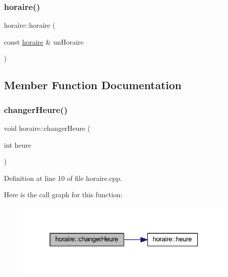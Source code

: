 \subsubsection{\texorpdfstring{horaire()}{horaire()}\hspace{0.1cm}{\footnotesize\ttfamily [3/3]}}
{\footnotesize\ttfamily horaire\+::horaire (\begin{DoxyParamCaption}\item[{const \hyperlink{classhoraire}{horaire} \&}]{un\+Horaire }\end{DoxyParamCaption})\hspace{0.3cm}{\ttfamily [default]}}



\subsection{Member Function Documentation}
\hypertarget{classhoraire_ac4685ee68148ad0d2200f8f188ea1b69}{}\label{classhoraire_ac4685ee68148ad0d2200f8f188ea1b69} 
\subsubsection{\texorpdfstring{changer\+Heure()}{changerHeure()}}
{\footnotesize\ttfamily void horaire\+::changer\+Heure (\begin{DoxyParamCaption}\item[{int}]{heure }\end{DoxyParamCaption})}



Definition at line 10 of file horaire.\+cpp.

Here is the call graph for this function\+:\nopagebreak
\begin{figure}[H]
\begin{center}
\leavevmode
\includegraphics[width=304pt]{classhoraire_ac4685ee68148ad0d2200f8f188ea1b69_cgraph}
\end{center}
\end{figure}
\hypertarget{classhoraire_a5f9db9929031e9f94460a81dccf6e273}{}\label{classhoraire_a5f9db9929031e9f94460a81dccf6e273} 
